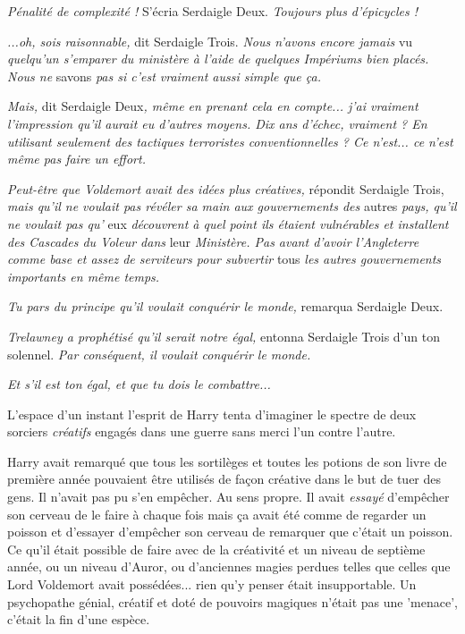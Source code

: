 \emph{Pénalité de complexité ! } S'écria Serdaigle Deux. \emph{Toujours plus d'épicycles !} 

\emph{...oh, sois raisonnable, } dit Serdaigle Trois. \emph{Nous n'avons encore jamais } vu\emph{ quelqu'un s'emparer du ministère à l'aide de quelques Impériums bien placés. Nous ne } savons \emph{pas si c'est vraiment aussi simple que ça.} 

\emph{Mais, } dit Serdaigle Deux\emph{, même en prenant cela en compte... j'ai vraiment l'impression qu'il aurait eu d'autres moyens. Dix ans d'échec, vraiment ? En utilisant seulement des tactiques terroristes conventionnelles ? Ce n'est... ce n'est même pas faire un effort.} 

\emph{Peut-être que Voldemort avait des idées plus créatives, } répondit Serdaigle Trois, \emph{mais qu'il ne voulait pas révéler sa main aux gouvernements des } autres \emph{pays, qu'il ne voulait pas qu'} eux \emph{découvrent à quel point ils étaient vulnérables et installent des Cascades du Voleur dans } leur\emph{ Ministère. Pas avant d'avoir l'Angleterre comme base et assez de serviteurs pour subvertir } tous\emph{ les autres gouvernements importants en même temps.} 

\emph{Tu pars du principe qu'il voulait conquérir le monde, } remarqua Serdaigle Deux.

\emph{Trelawney a prophétisé qu'il serait notre égal, } entonna Serdaigle Trois d'un ton solennel. \emph{Par conséquent, il voulait conquérir le monde.} 

\emph{Et s'il est ton égal, et que tu dois le combattre...} 

L'espace d'un instant l'esprit de Harry tenta d'imaginer le spectre de deux sorciers \emph{créatifs}  engagés dans une guerre sans merci l'un contre l'autre.

Harry avait remarqué que tous les sortilèges et toutes les potions de son livre de première année pouvaient être utilisés de façon créative dans le but de tuer des gens. Il n'avait pas pu s'en empêcher. Au sens propre. Il avait \emph{essayé}  d'empêcher son cerveau de le faire à chaque fois mais ça avait été comme de regarder un poisson et d'essayer d'empêcher son cerveau de remarquer que c'était un poisson. Ce qu'il était possible de faire avec de la créativité et un niveau de septième année, ou un niveau d'Auror, ou d'anciennes magies perdues telles que celles que Lord Voldemort avait possédées... rien qu'y penser était insupportable. Un psychopathe génial, créatif et doté de pouvoirs magiques n'était pas une 'menace', c'était la fin d'une espèce.


